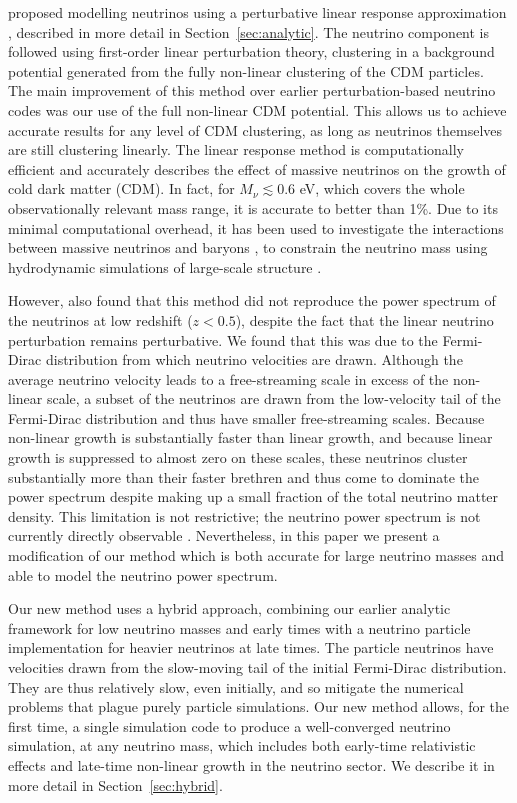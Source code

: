 \documentclass[useAMS, usenatbib]{mnras}
\begin{document}
\cite{AHB} proposed modelling neutrinos using a perturbative linear response approximation \citep{Bond_1980, Ma_1994}, described in more detail in Section~\ref{sec:analytic}. The neutrino component is followed using first-order linear perturbation theory, clustering in a background potential generated from the fully non-linear clustering of the CDM particles. The main improvement of this method over earlier perturbation-based neutrino codes \citep{Brandbyge_2009} was our use of the full non-linear CDM potential. This allows us to achieve accurate results for any level of CDM clustering, as long as neutrinos themselves are still clustering linearly.
The linear response method is computationally efficient and accurately describes the effect of massive neutrinos on the growth of cold dark matter (CDM).
In fact, for $M_\nu \lesssim 0.6$ eV, which covers the whole observationally relevant mass range, it is accurate to better than 1\%. Due to its minimal computational overhead,
it has been used to investigate the interactions between massive neutrinos and baryons \citep{Mummery_2017}, to constrain
the neutrino mass using hydrodynamic simulations of large-scale structure \citep{McCarthy_2017, McCarthy_2018}.

However, \cite{AHB} also found that this method did not reproduce the power spectrum of the neutrinos at low redshift ($z < 0.5$), despite the fact that the linear neutrino perturbation remains perturbative.
We found that this was due to the Fermi-Dirac distribution from which neutrino velocities are drawn. Although the average neutrino velocity leads to a free-streaming scale in excess of the non-linear scale, a subset of the neutrinos are drawn from the low-velocity tail of the Fermi-Dirac distribution and thus have smaller free-streaming scales. Because non-linear growth is substantially faster than linear growth, and because linear growth is suppressed to almost zero on these scales, these neutrinos cluster substantially more than their faster brethren and thus come to dominate the power spectrum despite making up a small fraction of the total neutrino matter density.
This limitation is not restrictive; the neutrino power spectrum is not currently directly observable \citep[but see][]{Ptolemy}.
Nevertheless, in this paper we present a modification of our method which is both accurate for large neutrino masses and able to model the neutrino power spectrum.

Our new method uses a hybrid approach, combining our earlier analytic framework for low neutrino masses and early times with a neutrino particle implementation for
heavier neutrinos at late times. The particle neutrinos have velocities drawn from the slow-moving tail of the initial Fermi-Dirac distribution. They are thus relatively slow,
even initially, and so mitigate the numerical problems that plague purely particle simulations. Our new method allows, for the first time, a single simulation code to produce a well-converged neutrino simulation, at any neutrino mass, which includes both early-time relativistic effects and late-time non-linear growth in the neutrino sector. We describe it in more detail in Section~\ref{sec:hybrid}.
\end{document}
